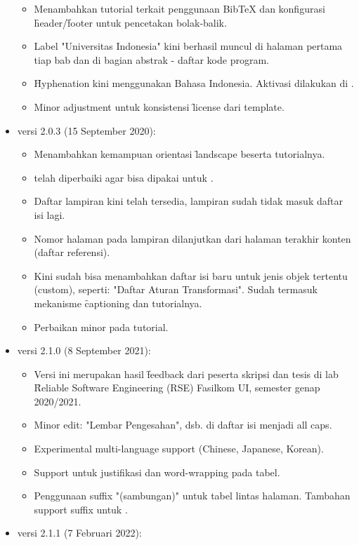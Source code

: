 \begin{itemize}
\begin{itemize}
			\item Menambahkan tutorial terkait penggunaan BibTeX dan konfigurasi \f{header}/\f{footer} untuk pencetakan bolak-balik.
			\item Label "Universitas Indonesia" kini berhasil muncul di halaman pertama tiap bab dan di bagian abstrak - daftar kode program.
			\item \f{Hyphenation} kini menggunakan  Bahasa Indonesia. Aktivasi dilakukan di .
			\item Minor adjustment untuk konsistensi \f{license} dari template.
		\end{itemize}
	\item versi 2.0.3 (15 September 2020):
		\begin{itemize}
			\item Menambahkan kemampuan orientasi \f{landscape} beserta tutorialnya.
			\item {} telah diperbaiki agar bisa dipakai untuk .
			\item Daftar lampiran kini telah tersedia, lampiran sudah tidak masuk daftar isi lagi.
			\item Nomor halaman pada lampiran dilanjutkan dari halaman terakhir konten (daftar referensi).
			\item Kini sudah bisa menambahkan daftar isi baru untuk jenis objek tertentu (custom), seperti: "Daftar Aturan Transformasi".
			Sudah termasuk mekanisme \f{captioning} dan tutorialnya.
			\item Perbaikan minor pada tutorial.
		\end{itemize}
	\item versi 2.1.0 (8 September 2021):
		\begin{itemize}
			\item Versi ini merupakan hasil \f{feedback} dari peserta skripsi dan tesis di lab \f{Reliable Software Engineering} (RSE) Fasilkom UI, semester genap 2020/2021.
			\item Minor edit: "Lembar Pengesahan", dsb. di daftar isi menjadi all caps.
			\item Experimental multi-language support (Chinese, Japanese, Korean).
			\item Support untuk justifikasi dan word-wrapping pada tabel.
			\item Penggunaan suffix "(sambungan)" untuk tabel lintas halaman. Tambahan support suffix untuk .
		\end{itemize}
	\item versi 2.1.1 (7 Februari 2022):

\end{itemize}
